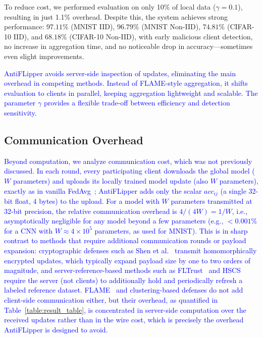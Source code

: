 \documentclass[conference]{IEEEtran}
\begin{document}
To reduce cost, we performed evaluation on only 10\% of local data ($\gamma = 0.1$), resulting in just 1.1\% overhead. Despite this, the system achieves strong performance: $97.11\%$ (MNIST IID), $96.79\%$ (MNIST Non-IID), $74.81\%$ (CIFAR-10 IID), and $68.18\%$ (CIFAR-10 Non-IID), with early malicious client detection, no increase in aggregation time, and no noticeable drop in accuracy—sometimes even slight improvements. 

\textcolor{blue}{AntiFLipper avoids server-side inspection of updates, eliminating the main overhead in competing methods. Instead of FLAME-style aggregation, it shifts evaluation to clients in parallel, keeping aggregation lightweight and scalable. The parameter $\gamma$ provides a flexible trade-off between efficiency and detection sensitivity.}

\subsection{Communication Overhead}
\textcolor{blue}{Beyond computation, we analyze communication cost, which was not previously discussed. In each round, every participating client downloads the global model ($W$ parameters) and uploads its locally trained model update (also $W$ parameters), exactly as in vanilla FedAvg~\cite{fedavg-pmlr-v54-mcmahan17a}; AntiFLipper adds only the scalar $acc_{ij}$ (a single 32-bit float, 4 bytes) to the upload. For a model with $W$ parameters transmitted at 32-bit precision, the relative communication overhead is $4/(4W) = 1/W$, i.e., asymptotically negligible for any model beyond a few parameters (e.g., $<0.001\%$ for a CNN with $W \approx 4\times 10^5$ parameters, as used for MNIST). This is in sharp contrast to methods that require additional communication rounds or payload expansion: cryptographic defenses such as Shen et al.~\cite{shen2024lfrppfl} transmit homomorphically encrypted updates, which typically expand payload size by one to two orders of magnitude, and server-reference-based methods such as FLTrust~\cite{cao2020fltrust} and HSCS~\cite{li2023hscs} require the server (not clients) to additionally hold and periodically refresh a labeled reference dataset. FLAME~\cite{nguyen2022flame} and clustering-based defenses do not add client-side communication either, but their overhead, as quantified in Table~\ref{table:result_table}, is concentrated in server-side computation over the received updates rather than in the wire cost, which is precisely the overhead AntiFLipper is designed to avoid.}
\end{document}
